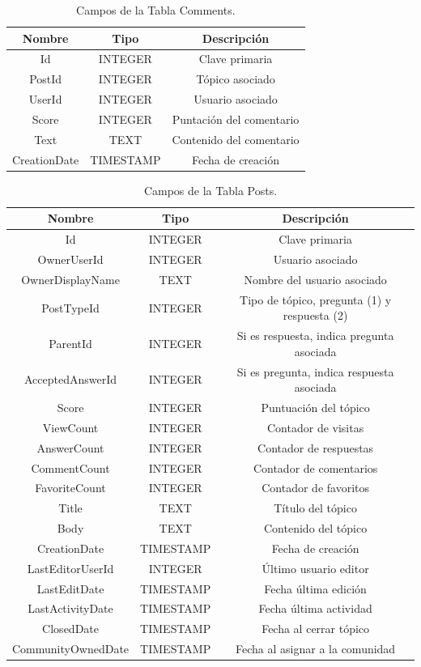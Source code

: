\begin{table}[h]
\caption{Campos de la Tabla Comments.}
\centering
\begin{tabular}{ccc}
\hline
Nombre & Tipo & Descripción \\
\hline
Id & INTEGER & Clave primaria \\
PostId & INTEGER & Tópico asociado \\
UserId & INTEGER & Usuario asociado \\ 
Score & INTEGER & Puntación del comentario \\ 
Text & TEXT & Contenido del comentario \\
CreationDate & TIMESTAMP & Fecha de creación \\
\hline
\end{tabular}
\end{table}

\begin{table}[h]
\caption{Campos de la Tabla Posts.}
\centering
\begin{tabular}{ccc}
\hline
Nombre & Tipo & Descripción \\
\hline
Id & INTEGER & Clave primaria \\
OwnerUserId & INTEGER & Usuario asociado \\
OwnerDisplayName & TEXT & Nombre del usuario asociado \\
PostTypeId & INTEGER & Tipo de tópico, pregunta (1) y respuesta (2) \\ 
ParentId & INTEGER & Si es respuesta, indica pregunta asociada \\
AcceptedAnswerId & INTEGER & Si es pregunta, indica respuesta asociada \\ 
Score & INTEGER & Puntuación del tópico \\
ViewCount & INTEGER & Contador de visitas \\
AnswerCount & INTEGER & Contador de respuestas \\
CommentCount & INTEGER & Contador de comentarios \\
FavoriteCount & INTEGER & Contador de favoritos \\
Title & TEXT & Título del tópico \\
Body & TEXT & Contenido del tópico \\
CreationDate & TIMESTAMP & Fecha de creación \\
LastEditorUserId & INTEGER & Último usuario editor \\
LastEditDate & TIMESTAMP & Fecha última edición \\
LastActivityDate & TIMESTAMP & Fecha última actividad \\
ClosedDate & TIMESTAMP & Fecha al cerrar tópico \\
CommunityOwnedDate & TIMESTAMP & Fecha al asignar a la comunidad \\
\hline
\end{tabular}
\end{table}

